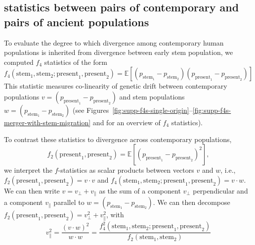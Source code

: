 \documentclass[]{article}
\newcommand{\tdwcomment}[1]{{\textcolor{cyan}{TDW: #1}}}
\newcommand{\E}{\mathbb{E}}
\begin{document}
\subsection{ statistics between pairs of contemporary
and pairs of ancient populations}
\label{sec:f4}


To evaluate the degree to which divergence among contemporary human populations is
inherited from divergence between early stem population, we computed $f_4$
statistics of the form
\begin{equation}
    f_4(\text{stem}_1, \text{stem}_2; \text{present}_1, \text{present}_2) = 
    \E[(p_{\text{stem}_1} - p_{\text{stem}_2} )(p_{\text{present}_1} -p_{\text{present}_2} )]
    \label{eq:f4}
\end{equation}
This statistic measures co-linearity of genetic drift between contemporary
populations $v= (p_{\text{present}_1} -p_{\text{present}_2} )$ and stem populations
$w= (p_{\text{stem}_1} -p_{\text{stem}_2} )$ (see
Figures~\ref{fig:supp-f4s-single-origin}--\ref{fig:supp-f4s-merger-with-stem-migration}
and \citet{Lipson2020-cq} for an overview of $f_4$ statistics).

To contrast these statistics to divergence across contemporary populations,
\begin{equation}
    f_2(\text{present}_1, \text{present}_2) =
    \E[(p_{\text{present}_1} -p_{\text{present}_2} )^2],
\end{equation}
we interpret the $f$-statistics as scalar products between vectors $v$ and $w$, i.e.,  
$f_2(\text{present}_1, \text{present}_2) = v\cdot v$ and 
$f_4(\text{stem}_1, \text{stem}_2; \text{present}_1, \text{present}_2) = v\cdot w.$
We can then write $v=v_\perp + v_\parallel$ as the sum of
a component $v_\perp$ perpendicular and
a component $v_\parallel$ parallel to
$w = (p_{\text{stem}_1} -p_{\text{stem}_2} ).$
We can then decompose 
$f_2(\text{present}_1,\text{present}_2) = v_\perp^2+v_\parallel^2$, with  
\begin{equation}
    v_\parallel^2 = \frac{(v \cdot w)^2}{w\cdot w} = \frac{ f_4^2(\text{stem}_1, \text{stem}_2; 
    \text{present}_1, \text{present}_2)}{f_2(\text{stem}_1, \text{stem}_2)}
\end{equation}
\end{document}
